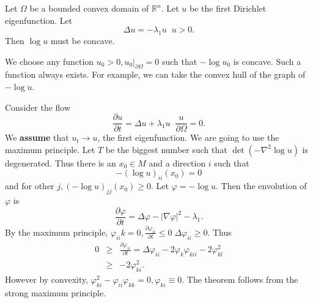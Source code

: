 \begin{theorem} Let $ \Omega $ be a bounded convex domain of $ \mathbb{R} ^n$.  Let $ u$ be the first Dirichlet eigenfunction. Let 
%
\[ \Delta u = - \lambda _1 u \;\; u > 0 .\]
%
Then $ \log u $ must be concave.
\end{theorem}
  We choose any function $ u_0 > 0 , u_0 |_{\partial \Omega} = 0 $ such that $ - \log u_0$ is concave. Such a function always exists. For example, we can take the convex hull of the graph of $-\log u$.

Consider the flow 
\[\frac{\partial u}{\partial t} = \Delta u + \lambda _1 u \;\; \frac{u}{\partial \Omega} = 0 .\]
%
We {\bf assume} that $ u_t \rightarrow u$, the first eigenfunction. We are going to use the maximum principle. Let $ T$ be the biggest number such that $ \det (- \nabla ^2 \log u) $ is degenerated. Thus there is an $ x_0 \in M $ and a direction $ i$ such that 
%
\[ - ( \log u) _{ii} (x_0) = 0 \]
%
and for other $ j, ( - \log u) _{jj} (x_0) \geq 0$. Let $ \varphi = - \log u $. Then the envolution of $ \varphi $ is 
%
\[ \frac{\partial \varphi}{\partial t} = \Delta \varphi - |\nabla \varphi |^2 - \lambda _1 .\]
%
By the maximum principle, $ \varphi _{ii} k = 0 , \frac{\partial \varphi _{ii}}{\partial t} \leq 0 \; \Delta \varphi _{ii} \geq 0 $. Thus
%
\begin{eqnarray*}
0 &\geq & \frac{\partial \varphi _{ii}}{\partial t} = \Delta \varphi_{ii} - 2 \varphi _k \varphi_{kii} - 2 \varphi ^2_{kl}\\
&\geq & - 2 \varphi _{ki}^2. \end{eqnarray*}
%
However by convexity, $ \varphi_{ki}^2 - \varphi _{ii} \varphi_{kk}= 0, \varphi_{ki} \equiv 0 $. The theorem follows from the strong maximum principle. 





